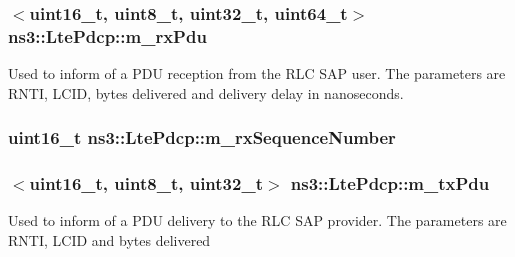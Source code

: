 \subsubsection[{\texorpdfstring{m\+\_\+rx\+Pdu}{m_rxPdu}}]{$<$uint16\+\_\+t, uint8\+\_\+t, uint32\+\_\+t, uint64\+\_\+t$>$ ns3\+::\+Lte\+Pdcp\+::m\+\_\+rx\+Pdu\hspace{0.3cm}{\ttfamily [protected]}}\hypertarget{classns3_1_1LtePdcp_a7474735eca041245a0552815789f88f8}{}\label{classns3_1_1LtePdcp_a7474735eca041245a0552815789f88f8}
Used to inform of a P\+DU reception from the R\+LC S\+AP user. The parameters are R\+N\+TI, L\+C\+ID, bytes delivered and delivery delay in nanoseconds. 
\subsubsection[{\texorpdfstring{m\+\_\+rx\+Sequence\+Number}{m_rxSequenceNumber}}]{\setlength{\rightskip}{0pt plus 5cm}uint16\+\_\+t ns3\+::\+Lte\+Pdcp\+::m\+\_\+rx\+Sequence\+Number\hspace{0.3cm}{\ttfamily [private]}}\hypertarget{classns3_1_1LtePdcp_a0b2d8af5261983cd068ed0b1bdde628d}{}\label{classns3_1_1LtePdcp_a0b2d8af5261983cd068ed0b1bdde628d}
\subsubsection[{\texorpdfstring{m\+\_\+tx\+Pdu}{m_txPdu}}]{$<$uint16\+\_\+t, uint8\+\_\+t, uint32\+\_\+t$>$ ns3\+::\+Lte\+Pdcp\+::m\+\_\+tx\+Pdu\hspace{0.3cm}{\ttfamily [protected]}}\hypertarget{classns3_1_1LtePdcp_a8ab5389f30d088f468632e30cbf8a725}{}\label{classns3_1_1LtePdcp_a8ab5389f30d088f468632e30cbf8a725}
Used to inform of a P\+DU delivery to the R\+LC S\+AP provider. The parameters are R\+N\+TI, L\+C\+ID and bytes delivered 
